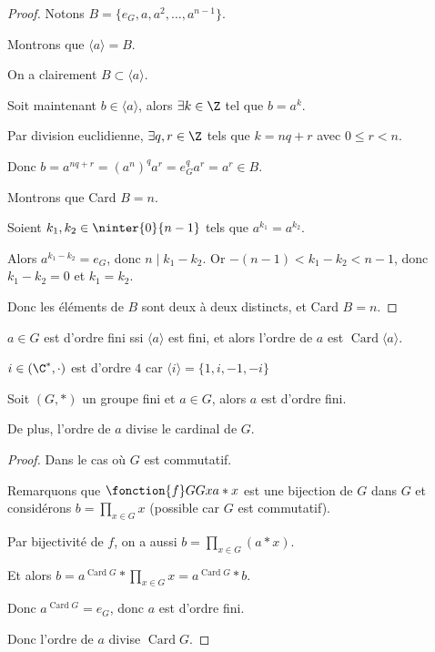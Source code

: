 
\begin{proof}
    Notons $B = \{e_G, a, a^2, \ldots, a^{n-1}\}$.

    Montrons que $\langle a \rangle = B$. 
    
    On a clairement $B \subset \langle a \rangle$.

    Soit maintenant $b \in \langle a \rangle$, alors $\exists k \in \Z$ tel que $b = a^k$.

    Par division euclidienne, $\exists q, r \in \Z$ tels que $k = nq + r$ avec $0 \leq r < n$.

    Donc $b = a^{nq + r} = (a^n)^q a^r = e_G^q a^r = a^r \in B$.

    \avspace Montrons que Card $B = n$.

    Soient $k_1, k_2 \in \ninter{0}{n-1}$ tels que $a^{k_1} = a^{k_2}$.

    Alors $a^{k_1 - k_2} = e_G$, donc $n \mid k_1 - k_2$.
    Or $-(n-1) < k_1 - k_2 < n-1$, donc $k_1 - k_2 = 0$ et $k_1 = k_2$.

    Donc les éléments de $B$ sont deux à deux distincts, et Card $B = n$.

\end{proof}

\begin{corollaire}{}{}
    $a \in G$ est d'ordre fini ssi $\langle a \rangle$ est fini, et alors l'ordre de 
    $a$ est $\operatorname{Card} \langle a \rangle$.
\end{corollaire}

\begin{exemple}
    $i \in (\C^*, \cdot)$ est d'ordre $4$ car
    $\langle i \rangle = \{1, i, -1, -i\}$
\end{exemple}

\begin{theoreme}{}{}
    Soit $(G, \ast)$ un groupe fini et $a \in G$, 
    alors $a$ est d'ordre fini. 

    De plus, l'ordre de $a$ divise le cardinal de $G$.
    
\end{theoreme}


\begin{proof}
    Dans le cas où $G$ est commutatif. 

    Remarquons que $\fonction{f} G G x {a \ast x}$ est une bijection de $G$ dans $G$
    et considérons $\displaystyle b = \prod_{x \in G} x$ (possible car $G$ est commutatif).

    Par bijectivité de $f$, on a aussi $\displaystyle b = \prod_{x \in G} (a \ast x)$.

    Et alors $\displaystyle b = a^{\operatorname{Card} G} \ast \prod_{x \in G} x = a^{\operatorname{Card} G} \ast b$.

    Donc $a^{\operatorname{Card} G} = e_G$, donc $a$ est d'ordre fini.

    Donc l'ordre de $a$ divise $\operatorname{Card} G$.
\end{proof}

